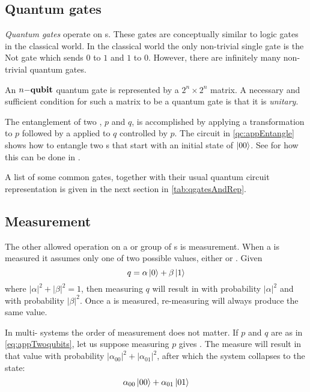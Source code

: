 
\subsection{Quantum gates} %
\label{sub:quantum_gates}

\emph{Quantum gates} operate on \qubit{}s. These
gates are conceptually similar to logic gates in the classical world.
 In the
classical world the only non-trivial single
\bit{} gate is the Not gate which
sends $0$ to $1$ and $1$ to $0$. However, there are
infinitely many non-trivial quantum
gates.

An $n{-}\mathbf{{qubit}}{}$ quantum gate is represented by
a $2^n \times 2^n$ matrix. A
necessary and sufficient condition for such a matrix to be
a quantum gate is that it is \emph{unitary}.

The entanglement of two \qubits{}, $p$ and $q$, is accomplished by applying a
\Had{} transformation to $p$ followed by
a \nottr{} applied to $q$ controlled by $p$.
The circuit in
\vref{qc:appEntangle} shows how to entangle two \qubit{}s that start with
an initial state of $\left\vert{00}\right\rangle$. See 
for how this can be done in \lqpl.

A list of some common gates, together with their usual
quantum circuit representation is given in the next section in
 \vref{tab:qgatesAndRep}.



\subsection{Measurement} %
\label{sub:measuerment}


The  other allowed
operation on a \qubit{} or group of \qubit{}s is
measurement. When a  \qubit{} is measured it
assumes only one of two possible values, either  or . Given
\begin{equation}
q=\alpha\left\vert{0}\right\rangle+\beta\left\vert{1}\right\rangle\label{eq:appSinglequbit}
\end{equation}
where $|\alpha|^2+|\beta|^2 = 1$, then measuring $q$ will result in
 with probability $|\alpha|^2$ and  with
probability $|\beta|^2$.
Once a \qubit{} is measured, re-measuring will always produce the same
value.

In multi-\qubit{} systems the order of measurement does not matter.
If $p$ and $q$ are as in \vref{eq:appTwoqubits}, let us suppose measuring $p$
gives  . The measure will result in  that value with probability
$|\alpha_{00}|^2 + |\alpha_{01}|^2$, after which the system
collapses to the state:
\begin{equation}
\alpha_{00}\left\vert{00}\right\rangle + \alpha_{01}\left\vert{01}\right\rangle\label{eq:appCollapsedFirstBit}
\end{equation}

